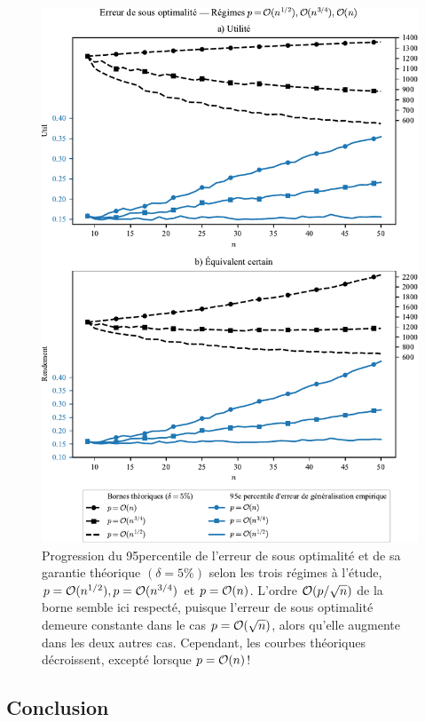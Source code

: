 \begin{figure}[h!]
  \centering
  \includegraphics[width=\textwidth]{../experiments/fig/bound_test.pdf}
  \caption[Erreur de sous optimalité -- Régimes $p=\bigO(n^{1/2}),\bigO(n^{3/4}),\bigO(n)$]
  {Progression du 95\ieme percentile de l'erreur de sous optimalité et de sa garantie
    théorique $(\delta=5\%)$ selon les trois régimes à l'étude,
    $p=\mathcal O(n^{1/2}),p=\mathcal O(n^{3/4})$ et $p=\mathcal O(n)$. L'ordre $\mathcal O(p/\sqrt{n})$ de la
    borne semble ici respecté, puisque l'erreur de sous optimalité demeure constante dans
    le cas $p=\mathcal O(\sqrt{n})$, alors qu'elle augmente dans les deux autres
    cas. Cependant, les courbes théoriques décroissent, excepté lorsque $p=\mathcal O(n)$!}
  \label{fig_bound_npgsou}
\end{figure}

\clearpage

\subsection{Conclusion}

